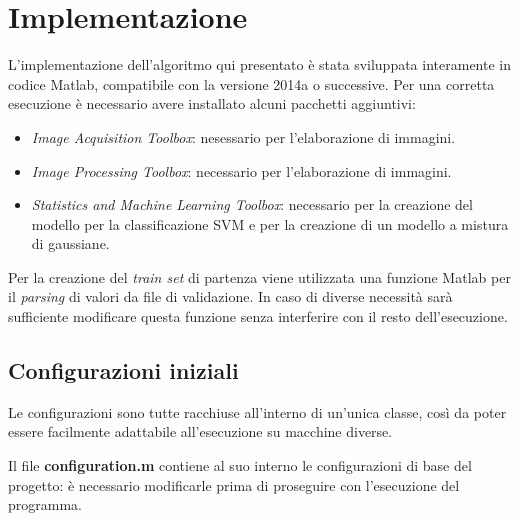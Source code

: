 \section{Implementazione}

L'implementazione dell'algoritmo qui presentato è stata sviluppata interamente in codice Matlab, compatibile con la versione 2014a o successive. 
Per una corretta esecuzione è necessario avere installato alcuni pacchetti aggiuntivi:

\begin{itemize}
\item \emph{Image Acquisition Toolbox}: nesessario per l'elaborazione di immagini.
\item \emph{Image Processing Toolbox}: necessario per l'elaborazione di immagini.
\item \emph{Statistics and Machine Learning Toolbox}: necessario per la creazione del modello per la classificazione SVM e per la creazione di un modello a mistura di gaussiane.
\end{itemize}

Per la creazione del \emph{train set} di partenza viene utilizzata una funzione Matlab per il \emph{parsing} di valori da file di validazione. In caso di diverse necessità sarà sufficiente modificare questa funzione senza interferire con il resto dell'esecuzione.

\subsection{Configurazioni iniziali}

Le configurazioni sono tutte racchiuse all'interno di un'unica classe, così da poter essere facilmente adattabile all'esecuzione su macchine diverse. 

Il file \textbf{configuration.m} contiene al suo interno le configurazioni di base del progetto: è necessario modificarle prima di proseguire con l'esecuzione del programma.

